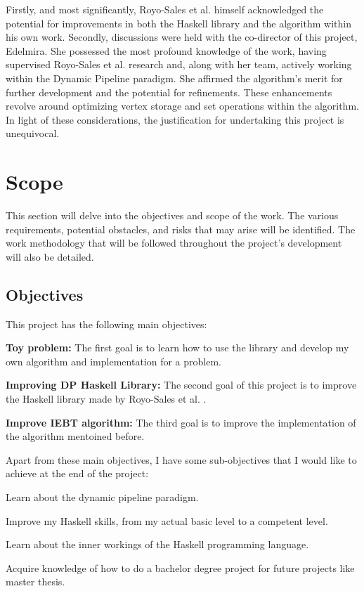 Firstly, and most significantly, Royo-Sales et al. \cite{royo_sales_algorithm_2021} himself acknowledged the potential for improvements in both the Haskell library and the algorithm within his own work.
Secondly, discussions were held with the co-director of this project, Edelmira.
She possessed the most profound knowledge of the work, having supervised Royo-Sales et al. \cite{royo_sales_algorithm_2021} research and, along with her team, actively working within the Dynamic Pipeline paradigm.
She affirmed the algorithm's merit for further development and the potential for refinements.
These enhancements revolve around optimizing vertex storage and set operations within the algorithm. \\

In light of these considerations, the justification for undertaking this project is unequivocal.
\section{Scope}
This section will delve into the objectives and scope of the work.
The various requirements, potential obstacles, and risks that may arise will be identified.
The work methodology that will be followed throughout the project's development will also be detailed.
\subsection{Objectives}
This project has the following main objectives:
\begin{list}{-}{}
    \item \textbf{Toy problem:} The first goal is to learn how to use the library and develop my own algorithm and implementation for a problem.
    \item \textbf{Improving DP Haskell Library:} The second goal of this project is to improve the Haskell library made by Royo-Sales et al. \cite{royo_sales_algorithm_2021}.
    \item \textbf{Improve IEBT algorithm:} The third goal is to improve the implementation of the algorithm mentoined before.
\end{list}
Apart from these main objectives, I have some sub-objectives that I would like to achieve at the end of the project:
\begin{list}{-}{}
    \item Learn about the dynamic pipeline paradigm.
    \item Improve my Haskell skills, from my actual basic level to a competent level.
    \item Learn about the inner workings of the Haskell programming language.
    \item Acquire knowledge of how to do a bachelor degree project for future projects like master thesis.
\end{list}
